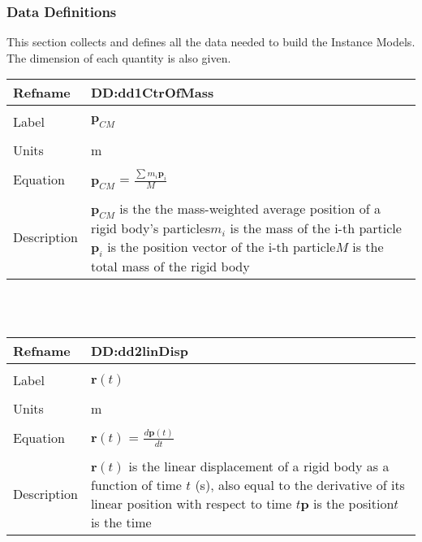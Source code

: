 \documentclass[12pt]{article}
\begin{document}
\subsubsection{Data Definitions}
\label{Sec:DDs}
This section collects and defines all the data needed to build the Instance Models. The dimension of each quantity is also given.
~\newline
\noindent \begin{minipage}{\textwidth}
\begin{tabular}{p{} p{}}
\toprule \textbf{Refname} & \textbf{DD:dd1CtrOfMass}
\label{DD:dd1CtrOfMass}
\\ \midrule \\
Label & $\mathbf{p}_{CM}$
\\ \midrule \\
Units & m
\\ \midrule \\
Equation & $\mathbf{p}_{CM}$ = $\frac{\sum{m_{i}\mathbf{p}_{i}}}{M}$
\\ \midrule \\
Description & $\mathbf{p}_{CM}$ is the the mass-weighted average position of a rigid body's particles\newline$m_{i}$ is the mass of the i-th particle\newline$\mathbf{p}_{i}$ is the position vector of the i-th particle\newline$M$ is the total mass of the rigid body
\\ \bottomrule \end{tabular}
\end{minipage}\\
~\newline
\noindent \begin{minipage}{\textwidth}
\begin{tabular}{p{} p{}}
\toprule \textbf{Refname} & \textbf{DD:dd2linDisp}
\label{DD:dd2linDisp}
\\ \midrule \\
Label & $\mathbf{r}(t)$
\\ \midrule \\
Units & m
\\ \midrule \\
Equation & $\mathbf{r}(t)$ = $\frac{d\mathbf{p}(t)}{dt}$
\\ \midrule \\
Description & $\mathbf{r}(t)$ is the linear displacement of a rigid body as a function of time $t$ (s), also equal to the derivative of its linear position with respect to time $t$\newline$\mathbf{p}$ is the position\newline$t$ is the time
\\ \bottomrule \end{tabular}
\end{minipage}\\
\end{document}
